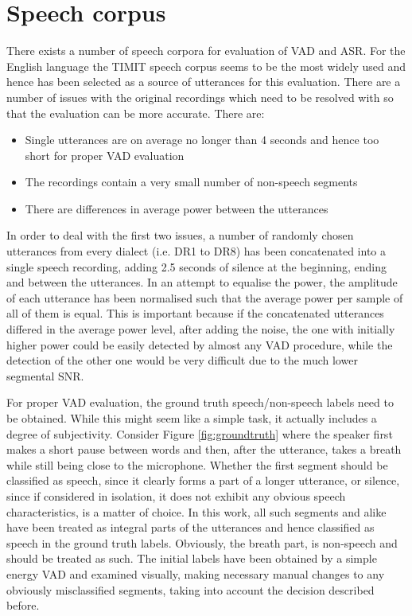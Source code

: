 
\section{Speech corpus}

There exists a number of speech corpora for evaluation of VAD and ASR. For the English language the TIMIT speech corpus \cite{TIMIT} seems to be the most widely used and hence has been selected as a source of utterances for this evaluation. There are a number of issues with the original recordings which need to be resolved with so that the evaluation can be more accurate. There are:

\begin{itemize}
\item Single utterances are on average no longer than 4 seconds and hence too short for proper VAD evaluation
\item The recordings contain a very small number of non-speech segments
\item There are differences in average power between the utterances
\end{itemize}

In order to deal with the first two issues, a number of randomly chosen utterances from every dialect (i.e. DR1 to DR8) has been concatenated into a single speech recording, adding 2.5 seconds of silence at the beginning, ending and between the utterances. In an attempt to equalise the power, the amplitude of each utterance has been normalised such that the average power per sample of all of them is equal. This is important because if the concatenated utterances differed in the average power level, after adding the noise, the one with initially higher power could be easily detected by almost any VAD procedure, while the detection of the other one would be very difficult due to the much lower segmental SNR.

For proper VAD evaluation, the ground truth speech/non-speech labels need to be obtained. While this might seem like a simple task, it actually includes a degree of subjectivity. Consider Figure \ref{fig:groundtruth} where the speaker first makes a short pause between words and then, after the utterance, takes a breath while still being close to the microphone. Whether the first segment should be classified as speech, since it clearly forms a part of a longer utterance, or silence, since if considered in isolation, it does not exhibit any obvious speech characteristics, is a matter of choice. In this work, all such segments and alike have been treated as integral parts of the utterances and hence classified as speech in the ground truth labels. Obviously, the breath part, is non-speech and should be treated as such. The initial labels have been obtained by a simple energy VAD and examined visually, making necessary manual changes to any obviously misclassified segments, taking into account the decision described before.

